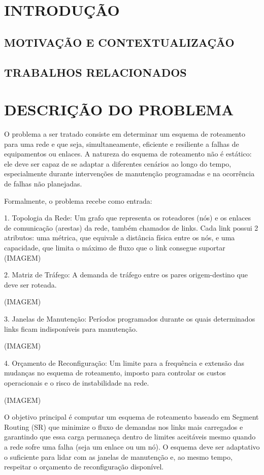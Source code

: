 \chapter{INTRODUÇÃO}


\section{\uppercase{Motivação e Contextualização}}

\section{TRABALHOS RELACIONADOS}

\chapter{DESCRIÇÃO DO PROBLEMA}

O problema a ser tratado consiste em determinar um esquema de roteamento para uma rede e que seja, simultaneamente, eficiente e resiliente a falhas de equipamentos ou enlaces. A natureza do esquema de roteamento não é estático: ele deve ser capaz de se adaptar a diferentes cenários ao longo do tempo, especialmente durante intervenções de manutenção programadas e na ocorrência de falhas não planejadas.

Formalmente, o problema recebe como entrada:

1.  Topologia da Rede: Um grafo que representa os roteadores (nós) e os enlaces de comunicação (arestas) da rede, também chamados de links. Cada link possui 2 atributos: uma métrica, que equivale a distância física entre os nós, e uma capacidade, que limita o máximo de fluxo que o link consegue suportar
    (IMAGEM)

2.  Matriz de Tráfego: A demanda de tráfego entre os pares origem-destino que deve ser roteada.

    (IMAGEM)
    
3.  Janelas de Manutenção: Períodos programados durante os quais determinados links ficam indisponíveis para manutenção.

    (IMAGEM)
    
4.  Orçamento de Reconfiguração: Um limite para a frequência e extensão das mudanças no esquema de roteamento, imposto para controlar os custos operacionais e o risco de instabilidade na rede.

    (IMAGEM)

O objetivo principal é computar um esquema de roteamento baseado em Segment Routing (SR) que minimize o fluxo de demandas nos links mais carregados e garantindo que essa carga permaneça dentro de limites aceitáveis mesmo quando a rede sofre uma falha (seja um enlace ou um nó). O esquema deve ser adaptativo o suficiente para lidar com as janelas de manutenção e, ao mesmo tempo, respeitar o orçamento de reconfiguração disponível.

